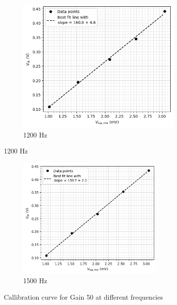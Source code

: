 \begin{figure}[H]
    \begin{subfigure}{\linewidth}
    \includegraphics[width=0.9\textwidth]{images/a4.png}
    \caption{1200 Hz}
    \end{subfigure}
    \end{figure}
        
    \begin{figure}[H]
    \ContinuedFloat
    
    \begin{subfigure}{\linewidth}
    \centering
    \includegraphics[width=0.80\textwidth]{images/a5.png}
    \caption{1500 Hz}
    \end{subfigure}
    
    \caption{Callibration curve for Gain 50 at different frequencies}
    \label{g1}
\end{figure}

